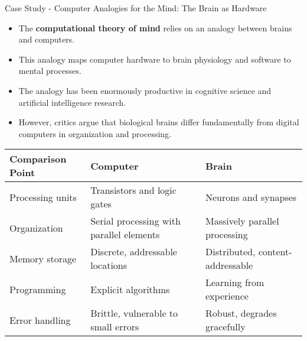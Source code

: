 \documentclass{beamer}
\begin{document}
	\begin{frame}{Case Study - Computer Analogies for the Mind: The Brain as Hardware}
		\begin{itemize}
			\item The \textbf{computational theory of mind} relies on an analogy between brains and computers.
			\item This analogy maps computer hardware to brain physiology and software to mental processes.
			\item The analogy has been enormously productive in cognitive science and artificial intelligence research.
			\item However, critics argue that biological brains differ fundamentally from digital computers in organization and processing.
		\end{itemize}
		
		\begin{table}
			\scriptsize
			\begin{tabular}{|p{2.5cm}|p{4cm}|p{4cm}|}
				\hline
				\textbf{Comparison Point} & \textbf{Computer} & \textbf{Brain} \\
				\hline
				Processing units & Transistors and logic gates & Neurons and synapses \\
				\hline
				Organization & Serial processing with parallel elements & Massively parallel processing \\
				\hline
				Memory storage & Discrete, addressable locations & Distributed, content-addressable \\
				\hline
				Programming & Explicit algorithms & Learning from experience \\
				\hline
				Error handling & Brittle, vulnerable to small errors & Robust, degrades gracefully \\
				\hline
			\end{tabular}
		\end{table}
	\end{frame}
	
\end{document}
